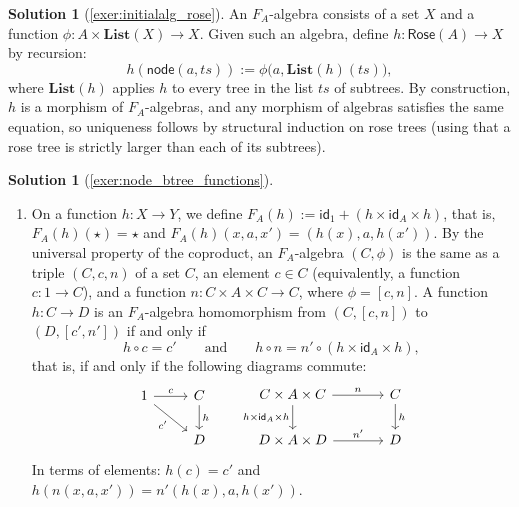 \documentclass[a4paper,11pt, oneside,titlepage=false]{scrbook}
\theoremstyle{plain}
\theoremstyle{definition}
\newtheorem{solution}[thm]{Solution}
\newcommand{\cfont}[1]{\ensuremath{\mathsf{#1}}}
\newcommand{\Catb}[1]{\mathbf{#1}}
\newcommand{\List}{\Catb{List}}
\newcommand{\Id}[1][]{\cfont{id}_{#1}}
\begin{document}
\begin{solution}[\cref{exer:initialalg_rose}]\label{sol:initialalg_rose}
  An $F_A$-algebra consists of a set $X$ and a function
  $\phi : A \times \List(X) \to X$.
  Given such an algebra, define $h : \mathsf{Rose}(A) \to X$ by recursion:
  \[
  h(\mathsf{node}(a, ts)) := \phi\big(a, \List(h)(ts)\big),
  \]
  where $\List(h)$ applies $h$ to every tree in the list $ts$ of subtrees.
  By construction, $h$ is a morphism of $F_A$-algebras, and any morphism of
  algebras satisfies the same equation, so uniqueness follows by structural
  induction on rose trees (using that a rose tree is strictly larger than each
  of its subtrees).
\end{solution}

\begin{solution}[\cref{exer:node_btree_functions}]\label{sol:node_btree_functions}
  \begin{enumerate}
  \item On a function $h : X \to Y$, we define $F_A(h) := \Id[1] + (h \times \Id[A] \times h)$, that is,
    $F_A(h)(\star) = \star$ and $F_A(h)(x, a, x') = (h(x), a, h(x'))$.
    By the universal property of the coproduct, an $F_A$-algebra $(C, \phi)$ is the same as a triple $(C, c, n)$
    of a set $C$, an element $c \in C$ (equivalently, a function $c : 1 \to C$), and a function $n : C \times A \times C \to C$,
    where $\phi = [c, n]$.
    A function $h : C \to D$ is an $F_A$-algebra homomorphism from $(C, [c, n])$ to $(D, [c', n'])$ if and only if
    \[ h \circ c = c' \qquad \text{and} \qquad h \circ n = n' \circ (h \times \Id[A] \times h), \]
    that is, if and only if the following diagrams commute:
    \[
      \begin{tikzcd}
        1 \ar[r, "c"] \ar[rd, "c'"'] & C \ar[d, "h"] \\ & D
      \end{tikzcd}
      \qquad
      \begin{tikzcd}[column sep=large]
        C \times A \times C \ar[r, "n"] \ar[d, "{h \times \Id[A] \times h}"'] & C \ar[d, "h"] \\ D \times A \times D \ar[r, "n'"] & D
      \end{tikzcd}
    \]
    In terms of elements: $h(c) = c'$ and $h(n(x, a, x')) = n'(h(x), a, h(x'))$.


\end{enumerate}
\end{solution}
\end{document}

